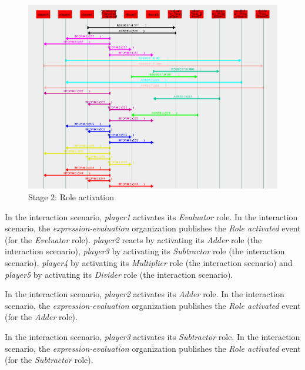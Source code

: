 \begin{figure}[H]
	\centering
	\includegraphics[width=\textwidth]{images/examples/example2-stage2.png}
	\caption{Stage 2: Role activation}
	\label{figure:example2-stage2}
\end{figure}

In the {} interaction scenario, \textit{player1} activates its \textit{Evaluator} role.
In the {} interaction scenario, the \textit{expression-evaluation} organization publishes the \textit{Role activated} event (for the \textit{Eveluator} role).
\textit{player2} reacts by activating its \textit{Adder} role (the {} interaction scenario), \textit{player3} by activating its \textit{Subtractor} role (the {} interaction scenario), \textit{player4} by activating its \textit{Multiplier} role (the {} interaction scenario) and \textit{player5} by activating its \textit{Divider} role (the {} interaction scenario).

In the {} interaction scenario, \textit{player2} activates its \textit{Adder} role.
In the {} interaction scenario, the \textit{expression-evaluation} organization publishes the \textit{Role activated} event (for the \textit{Adder} role).

In the {} interaction scenario, \textit{player3} activates its \textit{Subtractor} role.
In the {} interaction scenario, the \textit{expression-evaluation} organization publishes the \textit{Role activated} event (for the \textit{Subtractor} role).

